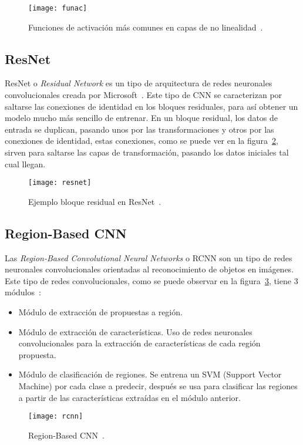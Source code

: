 \begin{figure}[h]
	\centering
	\texttt{[image: funac]}
	\caption[Funciones de activación más comunes en capas de no linealidad.]{Funciones de activación más comunes en capas de no linealidad~\cite{cnn}.}
	\label{fig:funac}
\end{figure}
\subsection{ResNet}
ResNet o \textit{Residual Network} es un tipo de arquitectura de redes neuronales convolucionales creada por Microsoft~\cite{resnet}. Este tipo de CNN se caracterizan por saltarse las conexiones de identidad en los bloques residuales, para así obtener un modelo mucho más sencillo de entrenar. En un bloque residual, los datos de entrada se duplican, pasando unos por las transformaciones y otros por las conexiones de identidad, estas conexiones, como se puede ver en la figura~\ref{fig:resnet}, sirven para saltarse las capas de transformación, pasando los datos iniciales tal cual llegan.

\begin{figure}[h]
	\centering
	\texttt{[image: resnet]}
	\caption[Ejemplo bloque residual en ResNet.]{Ejemplo bloque residual en ResNet~\cite{cnn}.}
	\label{fig:resnet}
\end{figure}
\subsection{Region-Based CNN}
Las \textit{Region-Based Convolutional Neural Networks} o RCNN son un tipo de redes neuronales convolucionales orientadas al reconocimiento de objetos en imágenes. Este tipo de redes convolucionales, como se puede observar en la figura~\ref{fig:rcnn}, tiene 3 módulos~\cite{cnn}:
\begin{itemize}
	\item Módulo de extracción de propuestas a región.
	\item Módulo de extracción de características. Uso de redes neuronales convolucionales para la extracción de características de cada región propuesta.
	\item Módulo de clasificación de regiones. Se entrena un SVM (Support Vector Machine) por cada clase a predecir, después se usa para clasificar las regiones a partir de las características extraídas en el módulo anterior.
\end{itemize}
\begin{figure}[h]
	\centering
	\texttt{[image: rcnn]}
	\caption[Region-Based CNN.]{Region-Based CNN~\cite{cnn}.}
	\label{fig:rcnn}
\end{figure}
